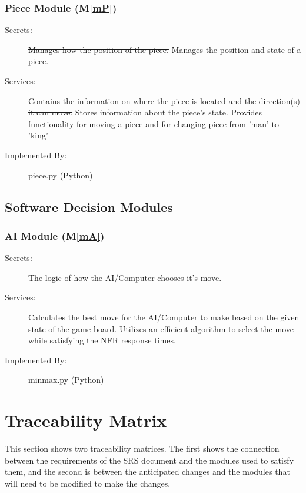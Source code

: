 \documentclass[12pt, titlepage]{article}
\newcommand{\mref}[1]{M\ref{#1}}
\begin{document}
\subsubsection{Piece Module (\mref{mP})}

\begin{description}
\item[Secrets:] \st{Manages how the position of the piece.} {\color{blue} Manages the position and state of a piece.}
\item[Services:] \st{Contains the information on where the piece is located and the direction(s) it can move.} {\color{blue} Stores information about the piece's state. Provides functionality for moving a piece and for changing piece from 'man' to 'king'}
\item[Implemented By:] piece.py (Python)
\end{description}

\subsection{Software Decision Modules}

\subsubsection{AI Module (\mref{mA})}
\begin{description}
\item[Secrets:] The logic of how the AI/Computer chooses it's move.
\item[Services:] Calculates the best move for the AI/Computer to make based on the given state of the game board. Utilizes an efficient algorithm to select the move while satisfying the NFR response times.
\item[Implemented By:] minmax.py (Python)
\end{description}

\section{Traceability Matrix} \label{SecTM}

This section shows two traceability matrices. The first shows the connection between the requirements of the SRS document and the modules used to satisfy them, and the second is between the anticipated changes and the modules that will need to be modified to make the changes.
\end{document}
